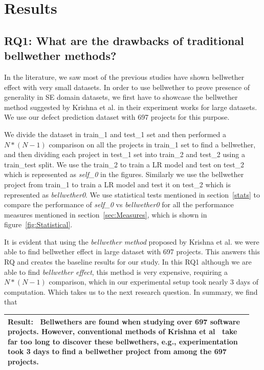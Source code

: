 \documentclass[10pt,journal,compsoc]{IEEEtran}
\newenvironment{result}
{\vspace{0.15cm}
\noindent\begin{minipage}{\linewidth}
\begin{center}
\arrayrulecolor{lightergray}
\begin{tabular}{|p{0.95\linewidth}|}
\hline%
\rowcolor{lightergray}%
\textbf{Result:}~%
}
{\\\hline
\end{tabular}
\end{center}
\end{minipage}
\vspace{0.15cm}
}
\begin{document}
\section{Results}
\label{sec:results}



\subsection*{RQ1: What are the drawbacks of traditional bellwether  methods?}
\label{sec:rq1}

In the literature, we saw most of the previous studies have shown bellwether effect with very small datasets. In order to use bellwether to prove presence of generality in SE domain datasets, we first have to showcase the bellwether method suggested by Krishna et al. in their experiment works for large datasets. We use our defect prediction dataset with 697 projects for this purpose. 

We divide the dataset in train\_1 and test\_1 set and then performed a $ N*(N-1) $ comparison on all the projects in train\_1 set to find a bellwether, and then dividing each project in test\_1 set into train\_2 and test\_2 using a train\_test split. We use the train\_2 to train a LR model and test on test\_2 which is represented as \textit{self\_0} in the figures. Similarly we use the bellwether project from train\_1 to train a LR model and test it on test\_2 which is represented as \textit{bellwether0}. We use statistical tests mentioned in section~\ref{stats} to compare the performance of \textit{self\_0} vs \textit{bellwether0} for all the performance measures mentioned in section~\ref{sec:Measures}, which is shown in figure~\ref{fig:Statistical}. 

It is evident that using the \textit{bellwether method} proposed by Krishna et al. we were able to find bellwether effect in large dataset with 697 projects. This answers this RQ and creates the baseline results for our study. In this RQ1 although we are able to find \textit{bellwether effect}, this method is very expensive, requiring a $ N*(N-1) $ comparison, which in our experimental setup took nearly 3 days of computation. Which takes us to the next research question. In summary, we find that 

\begin{result} {Bellwethers are found when studying over 697 software projects. However, conventional methods of Krishna et al~\cite{krishna2017learning} take far too long to discover these bellwethers, e.g., experimentation took 3 days to find a bellwether project from among the 697 projects.}
\end{result}
\end{document}
